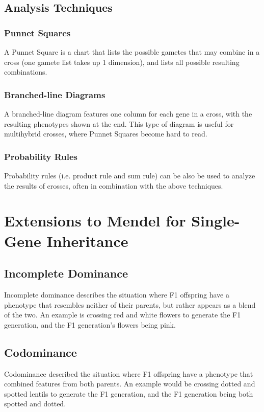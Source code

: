 \documentclass[12pt,titlepage]{article}
\begin{document}
      \subsection{Analysis Techniques}
        \subsubsection{Punnet Squares}
          A Punnet Square is a chart that lists the possible gametes that may combine in a cross (one gamete list takes up 1 dimension), and lists all
          possible resulting combinations.

        \subsubsection{Branched-line Diagrams}
          A branched-line diagram features one column for each gene in a cross, with the resulting phenotypes shown at the end. This type of diagram
          is useful for multihybrid crosses, where Punnet Squares become hard to read.

        \subsubsection{Probability Rules}
          Probability rules (i.e. product rule and sum rule) can be also be used to analyze the results of crosses, often in combination with the above
          techniques.

    \section{Extensions to Mendel for Single-Gene Inheritance}
      \subsection{Incomplete Dominance}
        Incomplete dominance describes the situation where F1 offspring have a phenotype that resembles neither of their parents, but rather appears as a blend
        of the two. An example is crossing red and white flowers to generate the F1 generation, and the F1 generation's flowers being pink.

      \subsection{Codominance}
        Codominance described the situation where F1 offspring have a phenotype that combined features from both parents. An example would be crossing dotted and
        spotted lentils to generate the F1 generation, and the F1 generation being both spotted and dotted.
\end{document}
